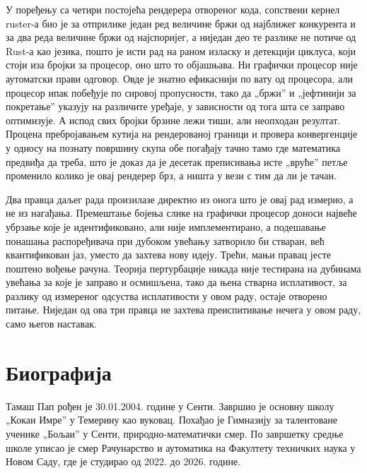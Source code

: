 \documentclass[serbian]{ftndiplomski}
\begin{document}
У поређењу са четири постојећа рендерера отвореног кода, сопствени кернел ruster-а
био је за отприлике један ред величине бржи од најближег конкурента и за два реда
величине бржи од најспоријег, а ниједан део те разлике не потиче од Rust-а као
језика, пошто је исти рад на раном изласку и детекцији циклуса, који стоји иза
бројки за процесор, оно што то објашњава. Ни графички процесор није аутоматски прави
одговор. Овде је знатно ефикаснији по вату од процесора, али процесор ипак побеђује
по сировој пропусности, тако да „бржи'' и „јефтинији за покретање'' указују на
различите уређаје, у зависности од тога шта се заправо оптимизује. А испод свих
бројки брзине лежи тиши, али неопходан резултат. Процена пребројавањем кутија на
рендерованој граници и провера конвергенције у односу на познату површину скупа обе
погађају тачно тамо где математика предвиђа да треба, што је доказ да је десетак
преписивања исте „вруће'' петље променило колико је овај рендерер брз, а ништа у
вези с тим да ли је тачан.

Два правца даљег рада произилазе директно из онога што је овај рад измерио, а не из
нагађања. Премештање бојења слике на графички процесор доноси највеће убрзање које је
идентификовано, али није имплементирано, а подешавање понашања распоређивача при
дубоком увећању затворило би стваран, већ квантификован јаз, уместо да захтева нову
идеју.
Трећи, мањи правац јесте поштено вођење рачуна. Теорија пертурбације никада није
тестирана на дубинама увећања за које је заправо и осмишљена, тако да њена стварна
исплативост, за разлику од измереног одсуства исплативости у овом раду, остаје
отворено питање. Ниједан од ова три правца не захтева преиспитивање нечега у овом
раду, само његов наставак.




\chapter*{Биографија}

Тамаш Пап рођен је 30.01.2004. године у Сенти. Завршио је основну школу „Кокаи Имре''
у Темерину као вуковац. Похађао је Гимназију за талентоване ученике „Бољаи'' у Сенти,
природно-математички смер. По завршетку средње школе уписао је смер Рачунарство и
аутоматика на Факултету техничких наука у Новом Саду, где је студирао од 2022. до
2026. године.

\end{document}
